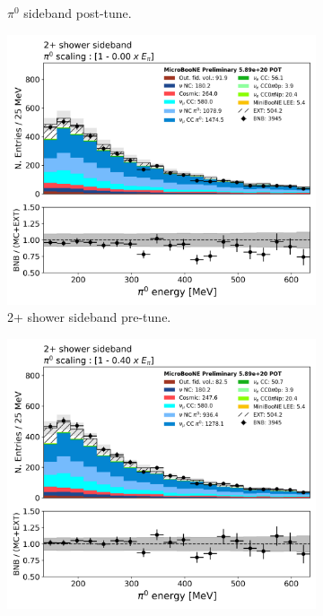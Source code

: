 \begin{figure}[H]
\begin{center}
\begin{subfigure}[b]{0.45\textwidth}
    \caption{\label{fig:pi0tune01} $\pi^0$ sideband post-tune.}
    \end{subfigure}
    \begin{subfigure}[b]{0.45\textwidth}
    \centering
    \includegraphics[width=1.00\textwidth]{pi0/pi0tune/pi0energy_000_scaling.png}
    \caption{\label{fig:pi0tune02} 2+ shower sideband pre-tune.}
    \end{subfigure}
    \begin{subfigure}[b]{0.45\textwidth}
    \centering
    \includegraphics[width=1.00\textwidth]{pi0/pi0tune/pi0energy_040_scaling.png}

\end{subfigure}
\end{center}
\end{figure}
